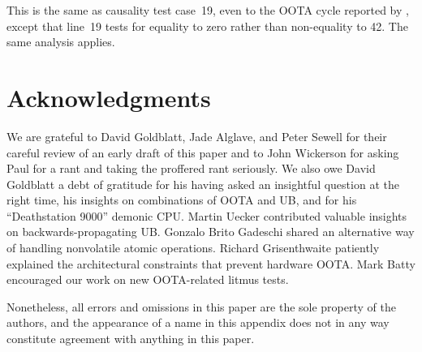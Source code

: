 \documentclass[10]{article}
\begin{document}
This is the same as causality test case~19, even to the OOTA cycle
reported by , except that line~19 tests
 for equality to zero rather than non-equality to 42.
The same analysis applies.

\clearpage

\section{Acknowledgments}
\label{sec:Acknowledgments}

We are grateful to David Goldblatt, Jade Alglave, and Peter
Sewell for their careful review of an early draft of this paper and
to John Wickerson for asking Paul for a rant and taking the proffered
rant seriously.
We also owe David Goldblatt a debt of gratitude for his having asked an
insightful question at the right time, his insights on combinations of
OOTA and UB, and for his ``Deathstation 9000'' demonic CPU.
Martin Uecker contributed valuable insights on backwards-propagating UB.
Gonzalo Brito Gadeschi shared an alternative way of handling nonvolatile
atomic operations.
Richard Grisenthwaite patiently explained the architectural constraints
that prevent hardware OOTA.
Mark Batty encouraged our work on new OOTA-related litmus tests.

Nonetheless, all errors and omissions in this paper are the sole property
of the authors, and the appearance of a name in this appendix does
not in any way constitute agreement with anything in this paper.

\end{document}
